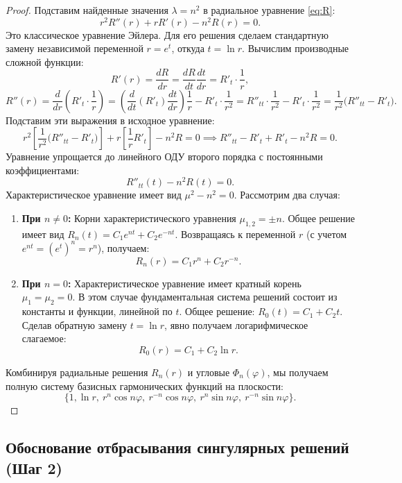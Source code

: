 \documentclass[a4paper,10pt]{article}
\begin{document}
\begin{proof}
Подставим найденные значения $\lambda = n^2$ в радиальное уравнение \eqref{eq:R}:
\[ r^2 R''(r) + r R'(r) - n^2 R(r) = 0. \]
Это классическое уравнение Эйлера. Для его решения сделаем стандартную замену независимой переменной $r = e^t$, откуда $t = \ln r$. 
Вычислим производные сложной функции:
\[ R'(r) = \frac{dR}{dr} = \frac{dR}{dt} \frac{dt}{dr} = R'_t \cdot \frac{1}{r}, \]
\[ R''(r) = \frac{d}{dr}\left( R'_t \cdot \frac{1}{r} \right) = \left( \frac{d}{dt}(R'_t) \frac{dt}{dr} \right) \frac{1}{r} - R'_t \cdot \frac{1}{r^2} = R''_{tt} \cdot \frac{1}{r^2} - R'_t \cdot \frac{1}{r^2} = \frac{1}{r^2} \big( R''_{tt} - R'_t \big). \]
Подставим эти выражения в исходное уравнение:
\[ r^2 \left[ \frac{1}{r^2} \big( R''_{tt} - R'_t \big) \right] + r \left[ \frac{1}{r} R'_t \right] - n^2 R = 0 \implies R''_{tt} - R'_t + R'_t - n^2 R = 0. \]
Уравнение упрощается до линейного ОДУ второго порядка с постоянными коэффициентами:
\[ R''_{tt}(t) - n^2 R(t) = 0. \]
Характеристическое уравнение имеет вид $\mu^2 - n^2 = 0$. Рассмотрим два случая:
\begin{enumerate}
    \item \textbf{При $n \neq 0$:} Корни характеристического уравнения $\mu_{1,2} = \pm n$. 
    Общее решение имеет вид $R_n(t) = C_1 e^{nt} + C_2 e^{-nt}$. 
    Возвращаясь к переменной $r$ (с учетом $e^{nt} = (e^t)^n = r^n$), получаем:
    \[ R_n(r) = C_1 r^n + C_2 r^{-n}. \]
    \item \textbf{При $n = 0$:} Характеристическое уравнение имеет кратный корень $\mu_1 = \mu_2 = 0$. 
    В этом случае фундаментальная система решений состоит из константы и функции, линейной по $t$. Общее решение: $R_0(t) = C_1 + C_2 t$. 
    Сделав обратную замену $t = \ln r$, явно получаем логарифмическое слагаемое:
    \[ R_0(r) = C_1 + C_2 \ln r. \]
\end{enumerate}
Комбинируя радиальные решения $R_n(r)$ и угловые $\Phi_n(\varphi)$, мы получаем полную систему базисных гармонических функций на плоскости:
\[ \{1, \ln r, \ r^n \cos n\varphi, \ r^{-n} \cos n\varphi, \ r^n \sin n\varphi, \ r^{-n} \sin n\varphi \}. \]
\end{proof}

\subsection*{Обоснование отбрасывания сингулярных решений (Шаг 2)}
\end{document}
